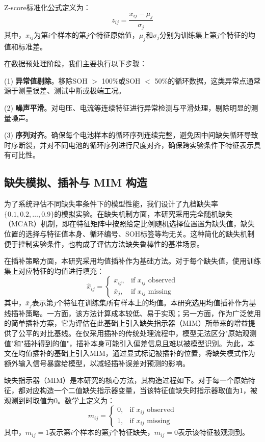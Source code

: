 \documentclass[10pt,a4paper]{ctexart}
\begin{document}
Z-score标准化公式定义为：
\begin{equation}
    z_{ij} = \frac{x_{ij} - \mu_j}{\sigma_j}
\end{equation}
其中，$x_{ij}$为第$i$个样本的第$j$个特征原始值，$\mu_j$和$\sigma_j$分别为训练集上第$j$个特征的均值和标准差。

在数据预处理阶段，我们主要执行以下步骤：

(1) \textbf{异常值剔除}。移除SOH $>$ 100\%或SOH $<$ 50\%的循环数据，这类异常点通常源于测量误差、测试中断或极端工况。

(2) \textbf{噪声平滑}。对电压、电流等连续特征进行异常检测与平滑处理，剔除明显的测量噪声。

(3) \textbf{序列对齐}。确保每个电池样本的循环序列连续完整，避免因中间缺失循环导致时序断裂，并对不同电池的循环序列进行尺度对齐，确保跨实验条件下特征表示具有可比性。

\subsection{缺失模拟、插补与 MIM 构造}

为了系统评估不同缺失率条件下的模型性能，我们设计了九档缺失率$\{0.1, 0.2, \ldots, 0.9\}$的模拟实验。在缺失机制方面，本研究采用完全随机缺失（MCAR）机制，即在特征矩阵中按照给定比例随机选择位置置为缺失值，缺失位置的选择与特征值本身、循环编号、SOH标签等均无关。这种简化的缺失机制便于控制实验条件，也构成了评估方法缺失鲁棒性的基准场景。

在插补策略方面，本研究采用均值插补作为基础方法。对于每个缺失值，使用训练集上对应特征的均值进行填充：
\begin{equation}
    \hat{x}_{ij} = \begin{cases}
        x_{ij}, & \text{if } x_{ij} \text{ observed} \\
        \bar{x}_j, & \text{if } x_{ij} \text{ missing}
    \end{cases}
\end{equation}
其中，$\bar{x}_j$表示第$j$个特征在训练集所有样本上的均值。本研究选用均值插补作为基线插补策略。一方面，该方法计算成本较低、易于实现；另一方面，作为广泛使用的简单插补方案，它为评估在此基础上引入缺失指示器（MIM）所带来的增益提供了公平的对比基线。在仅采用插补的传统处理流程中，模型无法区分"原始观测值"和"插补得到的值"，插补本身可能引入偏差信息且难以被模型识别。为此，本文在均值插补的基础上引入MIM，通过显式标记被插补的位置，将缺失模式作为额外输入信号暴露给模型，以减轻插补误差对预测的影响。

缺失指示器（MIM）是本研究的核心方法，其构造过程如下。对于每一个原始特征，都对应构造一个二值缺失指示器变量，当该特征值缺失时指示器取值为1，被观测到时取值为0。数学上定义为：
\begin{equation}
    m_{ij} = 
    \begin{cases}
        0, & \text{if } x_{ij} \text{ observed} \\
        1, & \text{if } x_{ij} \text{ missing}
    \end{cases}
\end{equation}
其中，$m_{ij}=1$表示第$i$个样本的第$j$个特征缺失，$m_{ij}=0$表示该特征被观测到。
\end{document}
